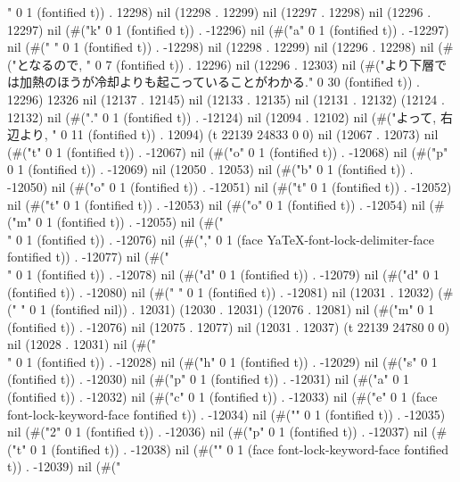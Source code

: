 " 0 1 (fontified t)) . 12298) nil (12298 . 12299) nil (12297 . 12298) nil (12296 . 12297) nil (#("k" 0 1 (fontified t)) . -12296) nil (#("a" 0 1 (fontified t)) . -12297) nil (#("
" 0 1 (fontified t)) . -12298) nil (12298 . 12299) nil (12296 . 12298) nil (#("となるので, " 0 7 (fontified t)) . 12296) nil (12296 . 12303) nil (#("より下層では加熱のほうが冷却よりも起こっていることがわかる." 0 30 (fontified t)) . 12296) 12326 nil (12137 . 12145) nil (12133 . 12135) nil (12131 . 12132) (12124 . 12132) nil (#("." 0 1 (fontified t)) . -12124) nil (12094 . 12102) nil (#("よって, 右辺より, " 0 11 (fontified t)) . 12094) (t 22139 24833 0 0) nil (12067 . 12073) nil (#("t" 0 1 (fontified t)) . -12067) nil (#("o" 0 1 (fontified t)) . -12068) nil (#("p" 0 1 (fontified t)) . -12069) nil (12050 . 12053) nil (#("b" 0 1 (fontified t)) . -12050) nil (#("o" 0 1 (fontified t)) . -12051) nil (#("t" 0 1 (fontified t)) . -12052) nil (#("t" 0 1 (fontified t)) . -12053) nil (#("o" 0 1 (fontified t)) . -12054) nil (#("m" 0 1 (fontified t)) . -12055) nil (#("\\" 0 1 (fontified t)) . -12076) nil (#("," 0 1 (face YaTeX-font-lock-delimiter-face fontified t)) . -12077) nil (#("\\" 0 1 (fontified t)) . -12078) nil (#("d" 0 1 (fontified t)) . -12079) nil (#("d" 0 1 (fontified t)) . -12080) nil (#(" " 0 1 (fontified t)) . -12081) nil (12031 . 12032) (#(" " 0 1 (fontified nil)) . 12031) (12030 . 12031) (12076 . 12081) nil (#("m" 0 1 (fontified t)) . -12076) nil (12075 . 12077) nil (12031 . 12037) (t 22139 24780 0 0) nil (12028 . 12031) nil (#("\\" 0 1 (fontified t)) . -12028) nil (#("h" 0 1 (fontified t)) . -12029) nil (#("s" 0 1 (fontified t)) . -12030) nil (#("p" 0 1 (fontified t)) . -12031) nil (#("a" 0 1 (fontified t)) . -12032) nil (#("c" 0 1 (fontified t)) . -12033) nil (#("e" 0 1 (face font-lock-keyword-face fontified t)) . -12034) nil (#("{" 0 1 (fontified t)) . -12035) nil (#("2" 0 1 (fontified t)) . -12036) nil (#("p" 0 1 (fontified t)) . -12037) nil (#("t" 0 1 (fontified t)) . -12038) nil (#("}" 0 1 (face font-lock-keyword-face fontified t)) . -12039) nil (#("
